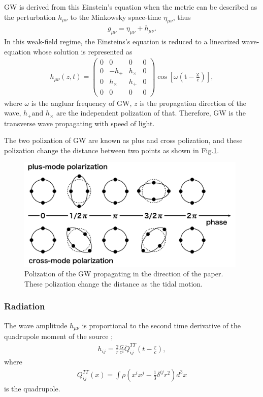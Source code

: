 GW is derived from this Einstein's equation when the metric can be described as the perturbation $h_{\mu\nu}$ to the Minkowsky space-time $\eta_{\mu\nu}$, thus
\begin{eqnarray}
  g_{\mu \nu}=\eta_{\mu \nu}+h_{\mu \nu}.
\end{eqnarray}
In this weak-field regime, the Einsteins's equation is reduced to a linearized wave-equation whose solution is represented as
\begin{eqnarray}
  h_{\mu \nu}(z, t)=\left(\begin{array}{cccc}{0} & {0} & {0} & {0} \\ {0} & {-h_{+}} & {h_{\times}} & {0} \\ {0} & {h_{\times}} & {h_{+}} & {0} \\ {0} & {0} & {0} & {0}\end{array}\right) \cos \left[\omega\left(\mathrm{t}-\frac{\mathrm{Z}}{\mathrm{c}}\right)\right],
\end{eqnarray}
where $\omega$ is the angluar frequency of GW, $z$ is the propagation direction of the wave, $h_{+} \text {and } h_{\times}$ are the independent polization of that. Therefore, GW is the transverse wave propagating with speed of light.

The two polization of GW are known as plus and cross polization, and these polization change the distance between two points as shown in Fig.\ref{img:img131}. 

\begin{figure}[h]
  \begin{center}   
    \includegraphics[width=11.0cm]{./img_chap1/img131.png}
    \caption[Polization of the GW]{Polization of the GW propagating in the direction of the paper. These polization change the distance as the tidal motion.
}\label{img:img131}
  \end{center}
\end{figure}

\subsubsection{Radiation}
The wave amplitude $h_{\mu\nu}$ is proportional to the second time derivative of the quadrupole moment of the source \cite{einstein1918gravitationswellen};
\begin{eqnarray}
  h_{i j}=\frac{2}{r} \frac{G}{c^{4}} \ddot{Q}_{i j}^{T T}\left(t-\frac{r}{c}\right),
\end{eqnarray}
where 
\begin{eqnarray}
  Q_{i j}^{T T}(x)=\int \rho\left(x^{i} x^{j}-\frac{1}{3} \delta^{i j} r^{2}\right) d^{3} x
\end{eqnarray}
is the quadrupole.

